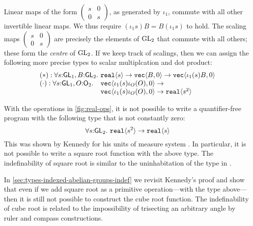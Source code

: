 Linear maps of the form $\left(
  \begin{smallmatrix}s & 0 \\ 0 & s\end{smallmatrix}\right)$, as
generated by $\iota_1$, commute with all other invertible linear
maps. We thus require
$(\iota_1 s)B = B(\iota_1 s)$ to hold.
The scaling maps $\left(
  \begin{smallmatrix}s & 0 \\ 0 & s\end{smallmatrix}\right)$
are precisely the elements of $\mathrm{GL}_2$ that commute with all others;
these form the \emph{centre} of $\mathrm{GL}_2$. If we keep track of
scalings, then we can assign the following more precise types to
scalar multiplcation and dot product:
\begin{displaymath}
\begin{array}{l@{}l}
  (*) : \forall s \mathord: \SynGL{1}, B \mathord:
  \SynGL{2}.\ & \tyPrim{real}{s} \to \tyPrim{vec}{B,0} \to
  \tyPrim{vec}{\iota_1(s)B,0}\\
    (\cdot) : \forall s \mathord: \SynGL{1}, O \mathord: \SynOrth{2}.\ & \tyPrim{vec}{\iota_1(s)\iota_O(O),0} \to\\
    &\tyPrim{vec}{\iota_1(s)\iota_O(O),0} \to \tyPrim{real}{s^2}
  \end{array}
\end{displaymath}

\begin{example}
  With the operations in \autoref{fig:real-ops}, it is not possible to
  write a quantifier-free program with the following type that is not
  constantly zero:
  \begin{displaymath}
    \forall s \mathord: \mathsf{GL}_2.\ \textup{\texttt{real}}\langle s^2 \rangle \to \textup{\texttt{real}}\langle s \rangle
  \end{displaymath}
  This was shown by Kennedy for his units of measure system
  \cite{kennedy97relational}.  In particular, it is not possible to
  write a square root function with the above type.  The
  indefinability of square root is similar to the uninhabitation of the
  type in .

  In \autoref{sec:types-indexed-abelian-groups-indef} we revisit
  Kennedy's proof and show that even if we add square root as a
  primitive operation---with the type above---then it is still not
  possible to construct the cube root function. The indefinability of
  cube root is related to the impossibility of trisecting an arbitrary
  angle by ruler and compass constructions.
\end{example}



